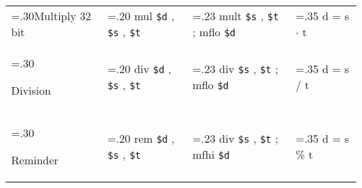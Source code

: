 \documentclass[varwidth=6in]{standalone}
\newcommand\lightrule{%
	\arrayrulecolor{black!30}%
	\midrule[\lightrulewidth]%
	\arrayrulecolor{black}}
\newcommand\register[1]{%
	\texttt{#1}%
}
\begin{document}
\begin{tabularx}{\textwidth}{ >{\hsize=.30\textwidth}X >{\hsize=.20\textwidth}X >{\hsize=.23\textwidth}X >{\hsize=.35\textwidth}X }


		Multiply 32 bit & mul \register{\$d}, \register{\$s}, \register{\$t} & mult \register{\$s}, \register{\$t}; mflo \register{\$d} & d = s \(\cdot\) t \\\lightrule

		Division & div \register{\$d}, \register{\$s}, \register{\$t} & div \register{\$s}, \register{\$t}; mflo \register{\$d} & d = s / t \\\lightrule

		Reminder & rem \register{\$d}, \register{\$s}, \register{\$t} & div \register{\$s}, \register{\$t}; mfhi \register{\$d} & d = s \% t \\
	\bottomrule
\end{tabularx}
\end{document}
